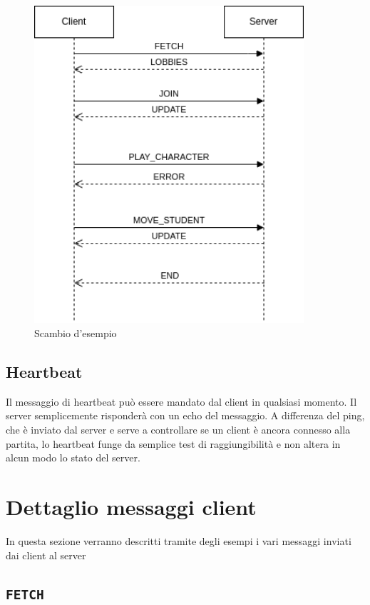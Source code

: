 \documentclass[a4paper,12pt]{article}
\begin{document}
\begin{figure}[htb]
  \centering
  \includegraphics[width=10cm]{example.png}
  \caption{Scambio d'esempio}%
  \label{fig:example}
\end{figure}

\newpage

\subsection{Heartbeat}

Il messaggio di heartbeat può essere mandato dal client in qualsiasi momento. Il
server semplicemente risponderà con un echo del messaggio. A differenza del
ping, che è inviato dal server e serve a controllare se un client è ancora
connesso alla partita, lo heartbeat funge da semplice test di raggiungibilità e
non altera in alcun modo lo stato del server.

\section{Dettaglio messaggi client}

In questa sezione verranno descritti tramite degli esempi i vari messaggi
inviati dai client al server

\subsection{\texttt{FETCH}}
\end{document}
